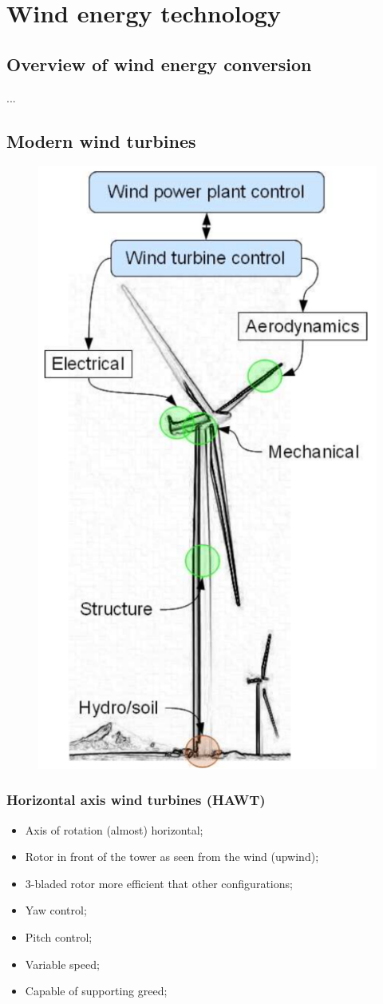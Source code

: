 \documentclass{article}
\begin{document}
\newpage
\section{Wind energy technology}
\subsection{Overview of wind energy conversion}
...

\subsection{Modern wind turbines}
\setlength{\intextsep}{0pt}%
\begin{figure}
    \includegraphics[width=.45\textwidth]{media/hawt.png}
    \vspace{-2.7cm}
\end{figure}

\phantom{}
\vspace*{-.8cm}
\subsubsection{Horizontal axis wind turbines (HAWT)}
\begin{itemize}
    \item Axis of rotation (almost) horizontal;
    \item Rotor in front of the tower as seen from the wind (upwind);
    \item 3-bladed rotor more efficient that other configurations;
    \item Yaw control;
    \item Pitch control;
    \item Variable speed;
    \item Capable of supporting greed;
\end{itemize}
\end{document}

